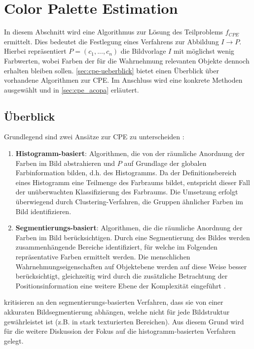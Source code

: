 
\section{Color Palette Estimation}
\label{sec:cpe}

In diesem Abschnitt wird eine Algorithmus zur Lösung des Teilproblems $f_{CPE}$ ermittelt. Dies bedeutet die Festlegung eines Verfahrens zur Abbildung $I \to P$. Hierbei repräsentiert $P = (c_1, ..., c_n)$ die Bildvorlage $I$ mit möglichst wenig Farbwerten, wobei Farben der für die Wahrnehmung relevanten Objekte dennoch erhalten bleiben sollen. \autoref{sec:cpe-ueberblick} bietet einen Überblick über vorhandene Algorithmen zur CPE. Im Anschluss wird  eine konkrete Methoden ausgewählt und in \autoref{sec:cpe_acopa} erläutert.

\subsection{Überblick}
\label{sec:cpe-ueberblick}

Grundlegend sind zwei Ansätze zur CPE zu unterscheiden \citep{image-based-schemes}:
\begin{enumerate}
    \item \textbf{Histogramm-basiert}: Algorithmen, die von der räumliche Anordnung der Farben im Bild abstrahieren und $P$ auf Grundlage der globalen Farbinformation bilden, d.h. des Histogramms. Da der Definitionsbereich eines Histogramm eine Teilmenge des Farbraums bildet, entspricht dieser Fall der unüberwachten Klassifizierung des Farbraums. Die Umsetzung erfolgt überwiegend durch Clustering-Verfahren, die Gruppen ähnlicher Farben im Bild identifizieren.
    \item \textbf{Segmentierungs-basiert}: Algorithmen, die die räumliche Anordnung der Farben im Bild berücksichtigen. Durch eine Segmentierung des Bildes werden zusammenhängende Bereiche identifiziert, für welche im Folgenden repräsentative Farben ermittelt werden. Die menschlichen Wahrnehmungseigenschaften auf Objektebene werden auf diese Weise besser berücksichtigt, gleichzeitig wird durch die zusätzliche Betrachtung der Positionsinformation eine weitere Ebene der Komplexität eingeführt \citep{colorthemes}.
\end{enumerate}

\citet{image-based-schemes} kritisieren an den segmentierungs-basierten Verfahren, dass sie von einer akkuraten Bildsegmentierung abhängen, welche nicht für jede Bildstruktur gewährleistet ist (z.B. in stark texturierten Bereichen). Aus diesem Grund wird für die weitere Diskussion der Fokus auf die histogramm-basierten Verfahren gelegt.

